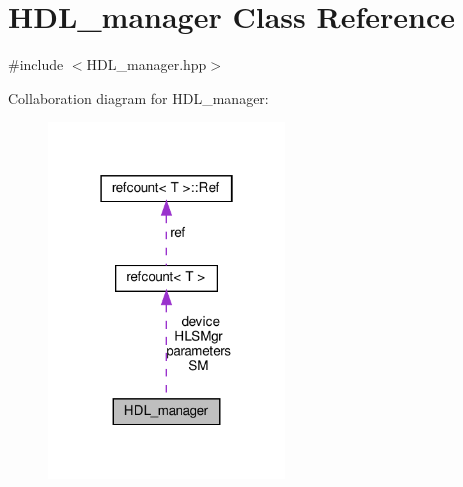 \hypertarget{classHDL__manager}{}\section{H\+D\+L\+\_\+manager Class Reference}
\label{classHDL__manager}


{\ttfamily \#include $<$H\+D\+L\+\_\+manager.\+hpp$>$}



Collaboration diagram for H\+D\+L\+\_\+manager\+:
\nopagebreak
\begin{figure}[H]
\begin{center}
\leavevmode
\includegraphics[width=178pt]{dc/d1f/classHDL__manager__coll__graph}
\end{center}
\end{figure}

